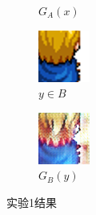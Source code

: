 \documentclass{beamer}
\begin{document}
\begin{frame}
\begin{figure}[htb]
\begin{subfigure}[b]{0.24\linewidth}
        \caption{$G_A(x)$}
      \end{subfigure}
      \begin{subfigure}[b]{0.24\linewidth}
        \includegraphics[width=\linewidth]{exp1_real_B.png}
        \caption{$y \in B$}
      \end{subfigure}
      \begin{subfigure}[b]{0.24\linewidth}
        \includegraphics[width=\linewidth]{exp1_fake_A.png}
        \caption{$G_B(y)$}
      \end{subfigure}
      \caption{实验1结果}
      \label{fig:exp1}
\end{figure}
\end{frame}
\end{document}

